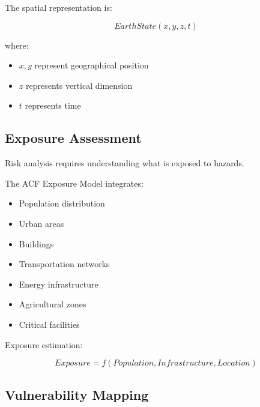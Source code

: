 The spatial representation is:

\[
EarthState(x,y,z,t)
\]


where:

\begin{itemize}

\item $x,y$ represent geographical position

\item $z$ represents vertical dimension

\item $t$ represents time

\end{itemize}



\subsection{Exposure Assessment}

Risk analysis requires understanding what is exposed to hazards.

The ACF Exposure Model integrates:

\begin{itemize}

\item Population distribution

\item Urban areas

\item Buildings

\item Transportation networks

\item Energy infrastructure

\item Agricultural zones

\item Critical facilities

\end{itemize}


Exposure estimation:

\[
Exposure=f(Population,Infrastructure,Location)
\]



\subsection{Vulnerability Mapping}

